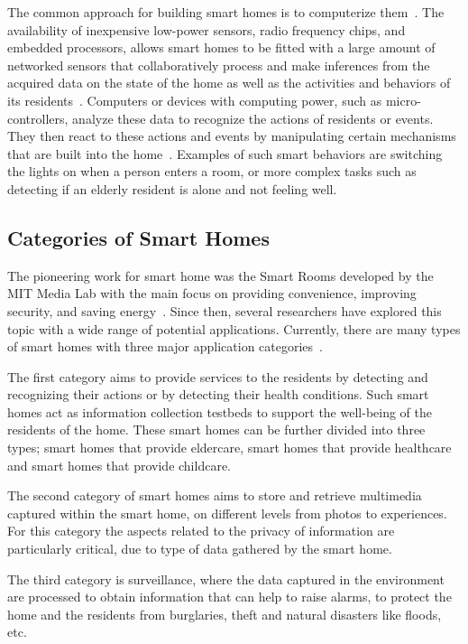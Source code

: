 The common approach for building smart homes is to computerize them~\parencite{desilvaStateArtSmart2012}. The availability of inexpensive low-power sensors, radio frequency chips, and embedded processors, allows smart homes to be fitted with a large amount of networked sensors that collaboratively process and make inferences from the acquired data on the state of the home as well as the activities and behaviors of its residents~\parencite{dingSensorTechnologySmart2011}. Computers or devices with computing power, such as micro-controllers, analyze these data to recognize the actions of residents or events. They then react to these actions and events by manipulating certain mechanisms that are built into the home~\parencite{desilvaStateArtSmart2012}. Examples of such smart behaviors are switching the lights on when a person enters a room, or more complex tasks such as detecting if an elderly resident is alone and not feeling well.

\subsection{Categories of Smart Homes}

The pioneering work for smart home was the Smart Rooms developed by the MIT Media Lab with the main focus on providing convenience, improving security, and saving energy~\parencite{pentlandSmartRooms1996,dingSensorTechnologySmart2011}. Since then, several researchers have explored this topic with a wide range of potential applications. Currently, there are many types of smart homes with three major application categories~\parencite{desilvaStateArtSmart2012}.

The first category aims to provide services to the residents by detecting and recognizing their actions or by detecting their health conditions. Such smart homes act as information collection testbeds to support the well-being of the residents of the home. These smart homes can be further divided into three types; smart homes that provide eldercare, smart homes that provide healthcare and smart homes that provide childcare.

The second category of smart homes aims to store and retrieve multimedia captured within the smart home, on different levels from photos to experiences.  For this category the aspects related to the privacy of information are particularly critical, due to type of data gathered by the smart home.

The third category is surveillance, where the data captured in the environment are processed to obtain information that can help to raise alarms, to protect the home and the residents from burglaries, theft and natural disasters like floods, etc.

